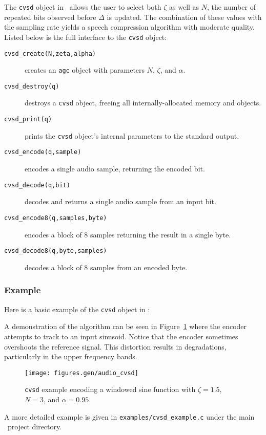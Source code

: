 The {\tt cvsd} object in \liquid\ allows the user to select both $\zeta$
as well as $N$, the number of repeated bits observed before $\Delta$ is
updated.
The combination of these values with the sampling rate yields a speech
compression algorithm with moderate quality.
Listed below is the full interface to the {\tt cvsd} object:
%
\begin{description}
\item[{\tt cvsd\_create(N,zeta,alpha)}]
    creates an {\tt agc} object with parameters $N$, $\zeta$, and
    $\alpha$.
\item[{\tt cvsd\_destroy(q)}]
    destroys a {\tt cvsd} object, freeing all internally-allocated
    memory and objects.
\item[{\tt cvsd\_print(q)}]
    prints the {\tt cvsd} object's internal parameters to the standard
    output.
\item[{\tt cvsd\_encode(q,sample)}]
    encodes a single audio sample, returning the encoded bit.
\item[{\tt cvsd\_decode(q,bit)}]
    decodes and returns a single audio sample from an input bit.
\item[{\tt cvsd\_encode8(q,samples,byte)}]
    encodes a block of 8 samples returning the result in a single byte.
\item[{\tt cvsd\_decode8(q,byte,samples)}]
    decodes a block of 8 samples from an encoded byte.
\end{description}

\subsubsection{Example}
\label{module:audio:cvsd:example}

Here is a basic example of the {\tt cvsd} object in \liquid:
%

%
A demonstration of the algorithm can be seen in
Figure~\ref{fig:module:audio:cvsd} where the encoder attempts to track to an
input sinusoid.
Notice that the encoder sometimes overshoots the reference signal.
This distortion results in degradations, particularly in the upper frequency
bands.
%
\begin{figure}
\centering
  \texttt{[image: figures.gen/audio\_cvsd]}
\caption{
    {\tt cvsd} example encoding a windowed sine function
    with $\zeta=1.5$, $N=3$, and $\alpha=0.95$.}
\label{fig:module:audio:cvsd}
\end{figure}
%
A more detailed example is given in
{\tt examples/cvsd\_example.c}
under the main \liquid\ project directory.
